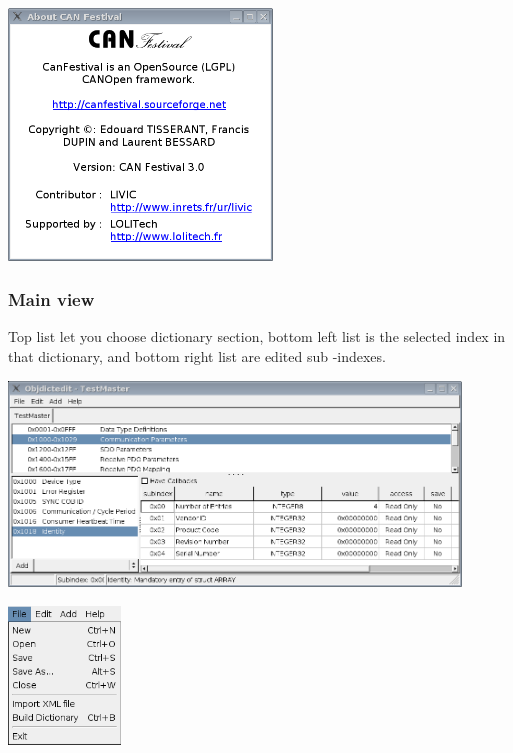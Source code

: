 \documentclass[12pt,english,a4paper]{book}
\begin{document}
\begin{center}
\includegraphics[width=7cm]{Pictures/10000201000001FC000001E5D65E8766} 
\par\end{center}


\subsubsection{Main view}

Top list let you choose dictionary section, bottom left list is the
selected index in that dictionary, and bottom right list are edited
sub -indexes.

\begin{center}
\includegraphics[width=12cm]{Pictures/10000201000003E7000001C7B0296577} 
\par\end{center}

\begin{center}
\includegraphics[width=3cm]{Pictures/10000000000000B6000000DF1EDD1E73} 
\par\end{center}
\end{document}
